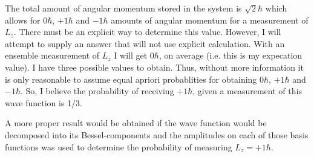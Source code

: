 \documentclass[aps,prl,preprint,groupedaddress]{revtex4-1}
\begin{document}
\begin{enumerate}
	The total amount of angular momentum stored in the system is $\sqrt{2}\hbar$ which allows for $0 \hbar$, $+1 \hbar$ and $-1 \hbar$ amounts of angular momentum for a measurement of $L_z$. There must be an explicit way to determine this value. However, I will attempt to supply an answer that will not use explicit calculation. With an ensemble measurement of $L_z$ I will get $0 \hbar$, on average (i.e. this is my expecation value). I have three possible values to obtain. Thus, without more information it is only reasonable to assume equal apriori probablities for obtaining $0 \hbar$, $+1 \hbar$ and $-1 \hbar$. So, I believe the probability of receiving $+1 \hbar$, given a measurement of this wave function is 1/3.
	
	A more proper result would be obtained if the wave function would be decomposed into its Bessel-components and the amplitudes on each of those basis functions was used to determine the probability of measuring $L_z = +1 \hbar$.
\end{enumerate}



\subsection{}
\subsubsection{}


%
\end{document}
